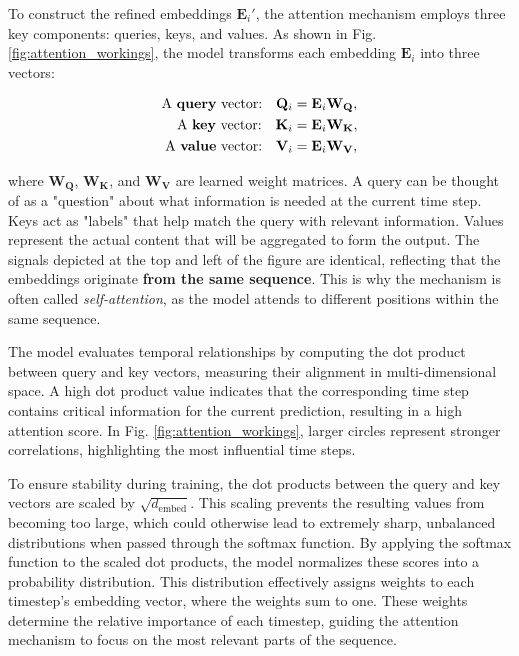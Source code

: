 To construct the refined embeddings $\mathbf{E}_i'$, the attention mechanism employs three key components: queries, keys, and values. As shown in Fig. \ref{fig:attention_workings}, the model transforms each embedding $\mathbf{E}_i$ into three vectors:

\begin{equation}
    \begin{aligned}
        \text{A \textbf{query} vector:} \quad \mathbf{Q}_i &= \mathbf{E}_i \mathbf{W_Q}, \\
        \text{A \textbf{key} vector:} \quad \mathbf{K}_i &= \mathbf{E}_i \mathbf{W_K}, \\
        \text{A \textbf{value} vector:} \quad \mathbf{V}_i &= \mathbf{E}_i \mathbf{W_V},
    \end{aligned}
\end{equation}

where $\mathbf{W_Q}$, $\mathbf{W_K}$, and $\mathbf{W_V}$ are learned weight matrices. A query can be thought of as a "question" about what information is needed at the current time step. Keys act as "labels" that help match the query with relevant information. Values represent the actual content that will be aggregated to form the output. The signals depicted at the top and left of the figure are identical, reflecting that the embeddings originate \textbf{from the same sequence}. This is why the mechanism is often called \textit{self-attention}, as the model attends to different positions within the same sequence.

The model evaluates temporal relationships by computing the dot product between query and key vectors, measuring their alignment in multi-dimensional space. A high dot product value indicates that the corresponding time step contains critical information for the current prediction, resulting in a high attention score. In Fig. \ref{fig:attention_workings}, larger circles represent stronger correlations, highlighting the most influential time steps.

To ensure stability during training, the dot products between the query and key vectors are scaled by $\sqrt{d_{\text{embed}}}$. This scaling prevents the resulting values from becoming too large, which could otherwise lead to extremely sharp, unbalanced distributions when passed through the softmax function. By applying the softmax function to the scaled dot products, the model normalizes these scores into a probability distribution. This distribution effectively assigns weights to each timestep's embedding vector, where the weights sum to one. These weights determine the relative importance of each timestep, guiding the attention mechanism to focus on the most relevant parts of the sequence.

